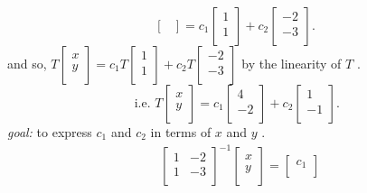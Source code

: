 \documentclass{report}
\begin{document}
{\[\begin{bmatrix}
	  \end{bmatrix}
	  = c_1 \begin{bmatrix}
	  1\\
	  1\\
	  \end{bmatrix}
	  + c_2 \begin{bmatrix}
	  -2\\
	  -3\\
	  \end{bmatrix}
	  .\] 
	  and so, $ T \begin{bmatrix}
	  x\\
	  y\\
	  \end{bmatrix}
	  = c_1 T \begin{bmatrix}
	  1\\
	  1\\
	  \end{bmatrix}
	  + c_2 T \begin{bmatrix}
	  -2\\
	  -3\\
	  \end{bmatrix}
	  $ by the linearity of $ T$ .\\
	  \[
	  \text{ i.e. } T \begin{bmatrix}
	  x\\
	  y\\
	  \end{bmatrix}
	  = c_1 \begin{bmatrix}
	  4\\
	  -2\\
	  \end{bmatrix}
	  + c_2 \begin{bmatrix}
	  1\\
	  -1\\
	  \end{bmatrix}
	  .\] 
	  \textit{goal:} to express $ c_1$ and $ c_2$ in terms of $ x$ and $ y$ .\\ 
	  \begin{align*}
		  & \begin{bmatrix}
	  	1 & -2\\
	  	1 & -3\\
	  	\end{bmatrix} ^{-1} \begin{bmatrix}
	  	x\\
	  	y\\
	  	\end{bmatrix}
	  	= \begin{bmatrix}
	  	c_1\\

\end{bmatrix}
\end{align*}}
\end{document}
